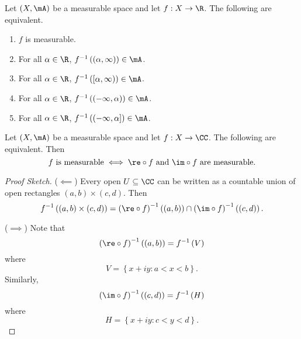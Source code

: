 \documentclass[pmath451]{subfiles}
\begin{document}
    \begin{prop}{}
        Let $\left( X,\mA \right)$ be a measurable space and let $f:X\to\R$. The following are equivalent.
        \begin{enumerate}
            \item $f$ is measurable.
            \item For all $\alpha\in\R$, $f^{-1}\left( \left( \alpha,\infty \right) \right)\in\mA$.
            \item For all $\alpha\in\R$, $f^{-1}\left( \left[ \alpha,\infty \right) \right)\in\mA$.
            \item For all $\alpha\in\R$, $f^{-1}\left( \left( -\infty,\alpha \right) \right)\in\mA$.
            \item For all $\alpha\in\R$, $f^{-1}\left( \left( -\infty,\alpha \right] \right)\in\mA$.
        \end{enumerate}
    \end{prop}

    \rruleline

    \clearpage

    \begin{prop}{}
        Let $\left( X,\mA \right)$ be a measurable space and let $f:X\to\CC$. The following are equivalent. Then
        \begin{equation*}
            \text{$f$ is measurable} \iff \text{$\re\circ f$ and $\im\circ f$ are measurable}.
        \end{equation*}
    \end{prop}

    \begin{proof}[Proof Sketch]
        ($\impliedby$) Every open $U\subseteq\CC$ can be written as a countable union of open rectangles $\left( a,b \right)\times\left( c,d \right)$. Then
        \begin{equation*}
            f^{-1}\left( \left( a,b \right)\times\left( c,d \right) \right) = \left( \re\circ f \right)^{-1}\left( \left( a,b \right) \right)\cap\left( \im\circ f \right)^{-1}\left( \left( c,d \right) \right).
        \end{equation*}

        ($\implies$) Note that
        \begin{equation*}
            \left( \re\circ f \right)^{-1}\left( \left( a,b \right) \right) = f^{-1}\left( V \right)
        \end{equation*}
        where
        \begin{equation*}
            V = \left\lbrace x+iy: a<x<b \right\rbrace.
        \end{equation*}
        Similarly,
        \begin{equation*}
            \left( \im\circ f \right)^{-1}\left( \left( c,d \right) \right) = f^{-1}\left( H \right)
        \end{equation*}
        where
        \begin{equation*}
            H = \left\lbrace x+iy: c<y<d \right\rbrace.
        \end{equation*}
    \end{proof}
\end{document}
